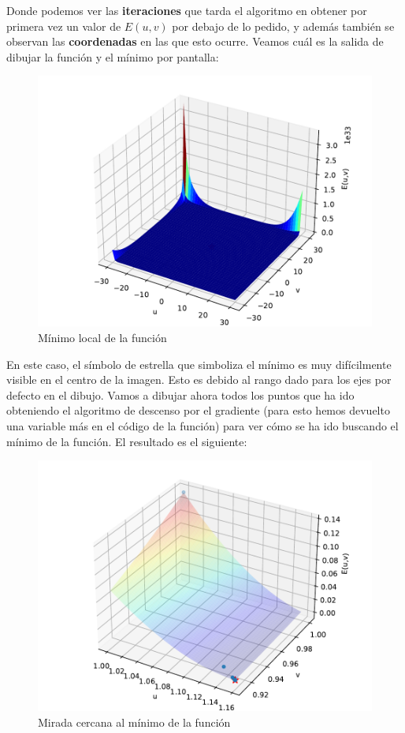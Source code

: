 \documentclass[12pt]{scrartcl}
\begin{document}
{Donde podemos ver las \textbf{iteraciones} que tarda el algoritmo en obtener por primera vez un valor de $E(u,v)$ por debajo de lo pedido, y además también
se observan las \textbf{coordenadas} en las que esto ocurre. Veamos cuál es la salida de dibujar la función y el mínimo por pantalla:

\begin{figure}[H]
  \centering
  \includegraphics[scale=0.6]{media/E1-1.pdf}
  \caption{Mínimo local de la función}
\end{figure}

En este caso, el símbolo de estrella que simboliza el mínimo es muy difícilmente visible en el centro de la imagen. Esto es debido al rango dado para los ejes por defecto en el dibujo.
Vamos a dibujar ahora todos los puntos que ha ido obteniendo el algoritmo de descenso por el gradiente (para esto hemos devuelto una variable más en el código de la función) para ver cómo se ha ido buscando 
el mínimo de la función. El resultado es el siguiente:

\begin{figure}[H]
  \centering
  \includegraphics[scale=0.6]{media/E1-1-all.pdf}
  \caption{Mirada cercana al mínimo de la función}
\end{figure}

}
\end{document}
